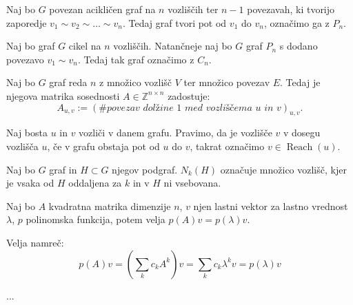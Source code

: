 \documentclass[fin1, tisk]{fmfdelo}
\newcommand{\ZZ}{\mathbb{Z}}
\newcommand{\reach}{\operatorname{Reach}}
\begin{document}
\begin{definicija}
Naj bo $G$ povezan acikličen graf na $n$ vozliščih ter $n - 1$ povezavah,
ki tvorijo zaporedje $v_1 \sim v_2 \sim \ldots \sim v_n$. Tedaj graf tvori 
pot od $v_1$ do $v_n$, označimo ga z $P_n$.
\end{definicija}

\begin{definicija}
Naj bo graf $G$ cikel na $n$ vozliščih. Natančneje naj bo $G$ graf $P_n$
s dodano povezavo $v_1 \sim v_n$. Tedaj tak graf označimo z $C_n$.
\end{definicija}

\begin{definicija}
Naj bo $G$ graf reda $n$ z množico vozlišč $V$ ter množico povezav $E$. Tedaj je 
njegova matrika sosednosti $A \in \ZZ ^ {n \times n}$ zadostuje:
\begin{equation}
A_{u, v} := \left(\# \textit{povezav dolžine 1 med vozliščema $u$ in $v$}\right)_{u, v}.
\end{equation}
\end{definicija}

\begin{definicija}
Naj bosta $u$ in $v$ vozliči v danem grafu. Pravimo, da je vozlišče 
$v$ v dosegu vozlišča $u$, če v grafu obstaja pot od $u$ do $v$, takrat 
označimo $v \in \reach(u)$.
\end{definicija}

\begin{definicija}
Naj bo $G$ graf in $H \subset G$ njegov podgraf. $N_k(H)$ označuje 
množico vozlišč, kjer je vsaka od $H$ oddaljena za $k$ in v $H$ ni 
vsebovana.
\end{definicija}

\begin{izrek}\label{iz:polinom_v_matriki}
Naj bo $A$ kvadratna matrika dimenzije $n$, $v$ njen lastni 
vektor za lastno vrednost $\lambda$, $p$ polinomska funkcija,
potem velja $p(A)v = p(\lambda)v$.
\end{izrek}

\begin{dokaz}
Velja namreč:
\begin{equation}
p(A)v = \left(\sum_{k} c_k A^k\right)v = 
\sum_{k} c_k \lambda^k v = p(\lambda)v
\end{equation}
\end{dokaz}

\begin{izrek} 
...
\end{izrek}
\end{document}
